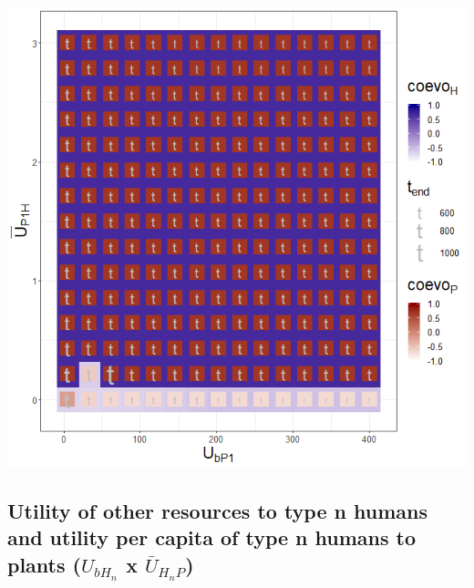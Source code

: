 \documentclass[]{book}
\begin{document}
\includegraphics[width=1\linewidth]{plots/3_twoPar-U.bP1-mU.P1H_plot}

\newpage

\hypertarget{utility-of-other-resources-to-type-n-humans-and-utility-per-capita-of-type-n-humans-to-plants-u_bh_n-x-baru_h_np}{%
\subsection{\texorpdfstring{Utility of other resources to type n humans and utility per capita of type n humans to plants (\(U_{bH_{n}}\) x \(\bar{U}_{H_{n}P}\))}{Utility of other resources to type n humans and utility per capita of type n humans to plants (U\_\{bH\_\{n\}\} x \textbackslash{}bar\{U\}\_\{H\_\{n\}P\})}}\label{utility-of-other-resources-to-type-n-humans-and-utility-per-capita-of-type-n-humans-to-plants-u_bh_n-x-baru_h_np}}
\end{document}
